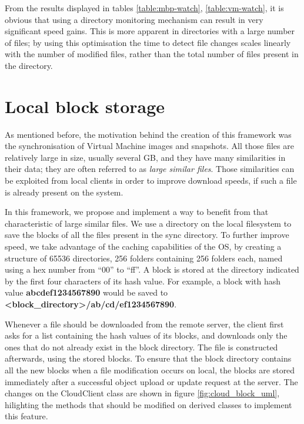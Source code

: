     From the results displayed in tables \ref{table:mbp-watch}, \ref{table:vm-watch}, it is obvious that using a directory monitoring mechanism can result in very significant speed gains. This is more apparent in directories with a large number of files; by using this optimisation the time to detect file changes scales linearly with the number of modified files, rather than the total number of files present in the directory.

\section{Local block storage}
  \label{sec:local_block}

  As mentioned before, the motivation behind the creation of this framework was the synchronisation of Virtual Machine images and snapshots. All those files are relatively large in size, usually several GB, and they have many similarities in their data; they are often referred to as \emph{large similar files}. Those similarities can be exploited from local clients in order to improve download speeds, if such a file is already present on the system.

  In this framework, we propose and implement a way to benefit from that characteristic of large similar files. We use a directory on the local filesystem to save the blocks of all the files present in the sync directory. To further improve speed, we take advantage of the caching capabilities of the OS, by creating a structure of 65536 directories, 256 folders containing 256 folders each, named using a hex number from ``00'' to ``ff''. A block is stored at the directory indicated by the first four characters of its hash value. For example, a block with hash value \textbf{abcdef1234567890} would be saved to \textbf{<block\_directory>/ab/cd/ef1234567890}.

  Whenever a file should be downloaded from the remote server, the client first asks for a list containing the hash values of its blocks, and downloads only the ones that do not already exist in the block directory. The file is constructed afterwards, using the stored blocks. To ensure that the block directory contains all the new blocks when a file modification occurs on local, the blocks are stored immediately after a successful object upload or update request at the server. The changes on the CloudClient class are shown in figure \ref{fig:cloud_block_uml}, hilighting the methods that should be modified on derived classes to implement this feature.

